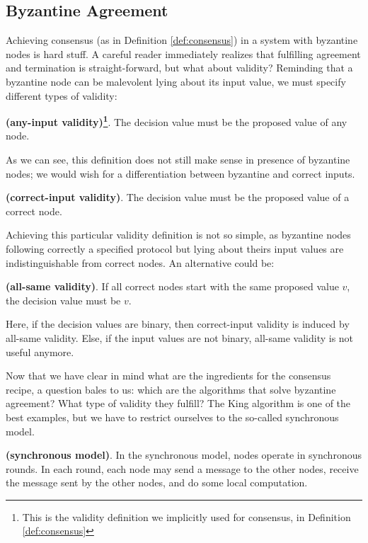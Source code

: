\subsection{Byzantine Agreement}
\label{sec:byzantine-agreement}
Achieving consensus (as in Definition \ref{def:consensus}) in a system with byzantine nodes is hard stuff. A careful reader immediately realizes that fulfilling agreement and termination is straight-forward, but what about validity? Reminding that a byzantine node can be malevolent lying about its input value, we must specify different types of validity:
\begin{mydef}{\bf (any-input validity)\footnote{This is the validity definition we implicitly used for consensus, in Definition \ref{def:consensus}}}.
    The decision value must be the proposed value of any node.
\end{mydef}
\noindent
As we can see, this definition does not still make sense in presence of byzantine nodes; we would wish for a differentiation between byzantine and correct inputs.
\begin{mydef}{\bf (correct-input validity)}.
    The decision value must be the proposed value of a correct node.
\end{mydef}
\noindent
Achieving this particular validity definition is not so simple, as byzantine nodes following correctly a specified protocol but lying about theirs input values are indistinguishable from correct nodes. An alternative could be:
\begin{mydef}{\bf (all-same validity)}.
    If all correct nodes start with the same proposed value $v$, the decision value must be $v$.
\end{mydef}
\noindent
Here, if the decision values are binary, then correct-input validity is induced by all-same validity. Else, if the input values are not binary, all-same validity is not useful anymore.

\bigskip
\noindent
Now that we have clear in mind what are the ingredients for the consensus recipe, a question bales to us: which are the algorithms that solve byzantine agreement? What type of validity they fulfill? The King algorithm is one of the best examples, but we have to restrict ourselves to the so-called synchronous model.
\begin{mydef}{\bf (synchronous model)}.
    In the synchronous model, nodes operate in synchronous rounds. In each round, each node may send a message to the other nodes, receive the message sent by the other nodes, and do some local computation.
\end{mydef}

